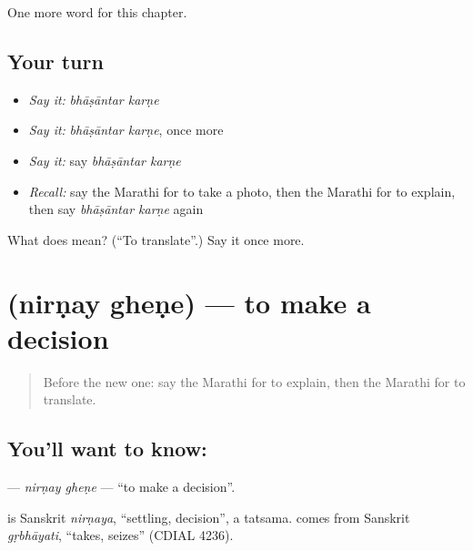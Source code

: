 \begin{grammarlens}[title={What you've built}]
One more word for this chapter.
\end{grammarlens}

\subsection*{Your turn}
\begin{itemize}
\raggedright
  \item \emph{Say it:} \emph{bhāṣāntar karṇe}
  \item \emph{Say it:} \emph{bhāṣāntar karṇe}, once more
  \item \emph{Say it:} say \emph{bhāṣāntar karṇe}
  \item \emph{Recall:} say the Marathi for to take a photo, then the Marathi for to explain, then say \emph{bhāṣāntar karṇe} again
\end{itemize}

\begin{tcolorbox}[breakable,colback=teal!4,colframe=teal!35!black,title={Before you move on}]
What does   mean? (\textquotedblleft{}To translate\textquotedblright{}.) Say it once more.
\end{tcolorbox}
\section[\texorpdfstring{\mr{निर्णय} \mr{घेणे} (nirṇay gheṇe)}{निर्णय घेणे (nirṇay gheṇe)}]{  (nirṇay gheṇe) — to make a decision}

\label{lesson:MR-C223-nirnay-ghene}



\begin{quote}
Before the new one: say the Marathi for to explain, then the Marathi for to translate.
\end{quote}

\subsection*{You'll want to know:  }
\textbf{ } — \emph{nirṇay gheṇe} — \textquotedblleft{}to make a decision\textquotedblright{}.

\begin{cousinweb}
\textbf{} is Sanskrit \emph{nirṇaya}, \textquotedblleft{}settling, decision\textquotedblright{}, a tatsama. \textbf{} comes from Sanskrit \emph{gṛbhāyati}, \textquotedblleft{}takes, seizes\textquotedblright{} (CDIAL 4236).
\end{cousinweb}

